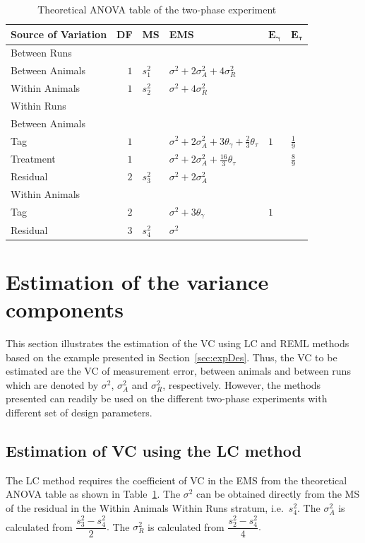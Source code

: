 \documentclass[12pt,a4paper]{article}
\begin{document}
\begin{table}[ht]
\centering
\caption{Theoretical ANOVA table of the two-phase experiment}
\begin{tabular}{lrllll} 
\toprule 
\multicolumn{1}{l}{\textbf{Source of Variation}} & \multicolumn{1}{l}{\textbf{DF}}& \multicolumn{1}{l}{\textbf{MS}} & \multicolumn{1}{l}{\textbf{EMS}}& \multicolumn{1}{l}{$\bm{E_{\gamma}}$}&\multicolumn{1}{l}{$\bm{E_{\tau}}$}\\ 
\midrule 
Between Runs & & &  & & \\ 
\quad Between Animals & $1$ &$s_1^2$ & $ \sigma^2+2\sigma_{A}^2+4\sigma_{R}^2$ & & \\ 
\quad Within Animals & $1$ &$s_2^2$& $\sigma^2+4\sigma_{R}^2$ & & \\ \hline 
Within Runs &  &&  & & \\ 
\quad Between Animals &&  &  & & \\ 
\quad \quad Tag & $1$ && $\sigma^2+2\sigma_{A}^2+3\theta_{\gamma}+\frac{2}{3}\theta_{\tau}$ &$1$ & $\frac{1}{9}$\\ 
\quad \quad Treatment & $1$ & & $\sigma^2+2\sigma_{A}^2+\frac{16}{3}\theta_{\tau}$ & & $\frac{8}{9}$\\ 
\quad \quad Residual & $2$ &$s_3^2$& $\sigma^2+2\sigma_{A}^2$ & & \\ \hline 
\quad Within Animals &  &&  & & \\ 
\quad \quad Tag & $2$ && $\sigma^2+3\theta_{\gamma}$ &$1$ & \\ 
\quad \quad Residual & $3$ &$s_4^2$& $\sigma^2$ & & \\ 
\bottomrule 
\end{tabular} 
\label{tab:Phase2ANOVA} 
\end{table} 

\section{Estimation of the variance components}
\label{sec:estVC}
This section illustrates the estimation of the VC using LC and REML methods based on the example presented in Section~\ref{sec:expDes}. Thus, the VC to be estimated are the VC of measurement error, between animals and between runs which are denoted by $\sigma^2$, $\sigma_A^2$ and $\sigma_R^2$, respectively. However, the methods presented can readily be used on the different two-phase experiments with different set of design parameters. 

\subsection{Estimation of VC using the LC method} 
The LC method requires the coefficient of VC in the EMS from the theoretical ANOVA table as shown in Table~\ref{tab:Phase2ANOVA}. The $\sigma^2$ can be obtained directly from the MS of the residual in the Within Animals Within Runs stratum, i.e.\ $s_4^2$. The $\sigma_A^2$ is calculated from $\dfrac{s_3^2 - s_4^2}{2}.$ The $\sigma_R^2$ is calculated from $\dfrac{s_2^2 - s_4^2}{4}.$ 
  
\end{document}
